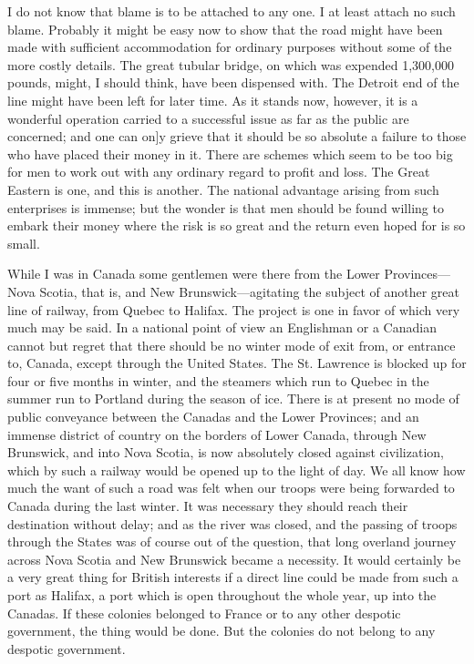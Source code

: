 I do not know that blame is to be attached to any one.  I at least
attach no such blame.  Probably it might be easy now to show that
the road might have been made with sufficient accommodation for
ordinary purposes without some of the more costly details.  The
great tubular bridge, on which was expended 1,300,000 pounds,
might, I should think, have been dispensed with.  The Detroit end
of the line might have been left for later time.  As it stands now,
however, it is a wonderful operation carried to a successful issue
as far as the public are concerned; and one can on]y grieve that it
should be so absolute a failure to those who have placed their
money in it.  There are schemes which seem to be too big for men to
work out with any ordinary regard to profit and loss.  The Great
Eastern is one, and this is another.  The national advantage
arising from such enterprises is immense; but the wonder is that
men should be found willing to embark their money where the risk is
so great and the return even hoped for is so small.

While I was in Canada some gentlemen were there from the Lower
Provinces---Nova Scotia, that is, and New Brunswick---agitating the
subject of another great line of railway, from Quebec to Halifax.
The project is one in favor of which very much may be said.  In a
national point of view an Englishman or a Canadian cannot but
regret that there should be no winter mode of exit from, or
entrance to, Canada, except through the United States.  The St.
Lawrence is blocked up for four or five months in winter, and the
steamers which run to Quebec in the summer run to Portland during
the season of ice.  There is at present no mode of public
conveyance between the Canadas and the Lower Provinces; and an
immense district of country on the borders of Lower Canada, through
New Brunswick, and into Nova Scotia, is now absolutely closed
against civilization, which by such a railway would be opened up to
the light of day.  We all know how much the want of such a road was
felt when our troops were being forwarded to Canada during the last
winter.  It was necessary they should reach their destination
without delay; and as the river was closed, and the passing of
troops through the States was of course out of the question, that
long overland journey across Nova Scotia and New Brunswick became a
necessity.  It would certainly be a very great thing for British
interests if a direct line could be made from such a port as
Halifax, a port which is open throughout the whole year, up into
the Canadas.  If these colonies belonged to France or to any other
despotic government, the thing would be done.  But the colonies do
not belong to any despotic government.

